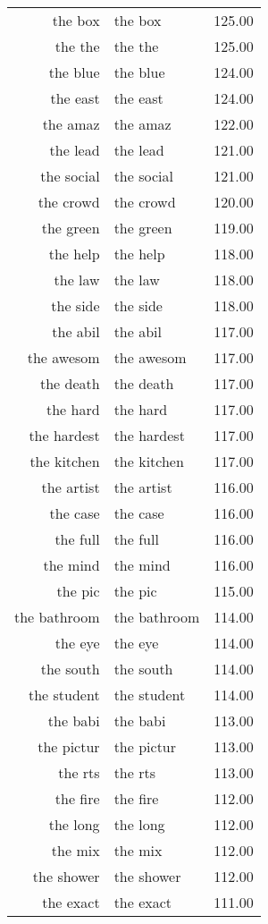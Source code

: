 \begin{table}[ht]
\begin{tabular}{rlr}
  the box & the box & 125.00 \\ 
  the the & the the & 125.00 \\ 
  the blue & the blue & 124.00 \\ 
  the east & the east & 124.00 \\ 
  the amaz & the amaz & 122.00 \\ 
  the lead & the lead & 121.00 \\ 
  the social & the social & 121.00 \\ 
  the crowd & the crowd & 120.00 \\ 
  the green & the green & 119.00 \\ 
  the help & the help & 118.00 \\ 
  the law & the law & 118.00 \\ 
  the side & the side & 118.00 \\ 
  the abil & the abil & 117.00 \\ 
  the awesom & the awesom & 117.00 \\ 
  the death & the death & 117.00 \\ 
  the hard & the hard & 117.00 \\ 
  the hardest & the hardest & 117.00 \\ 
  the kitchen & the kitchen & 117.00 \\ 
  the artist & the artist & 116.00 \\ 
  the case & the case & 116.00 \\ 
  the full & the full & 116.00 \\ 
  the mind & the mind & 116.00 \\ 
  the pic & the pic & 115.00 \\ 
  the bathroom & the bathroom & 114.00 \\ 
  the eye & the eye & 114.00 \\ 
  the south & the south & 114.00 \\ 
  the student & the student & 114.00 \\ 
  the babi & the babi & 113.00 \\ 
  the pictur & the pictur & 113.00 \\ 
  the rts & the rts & 113.00 \\ 
  the fire & the fire & 112.00 \\ 
  the long & the long & 112.00 \\ 
  the mix & the mix & 112.00 \\ 
  the shower & the shower & 112.00 \\ 
  the exact & the exact & 111.00 \\ 

\end{tabular}
\end{table}
